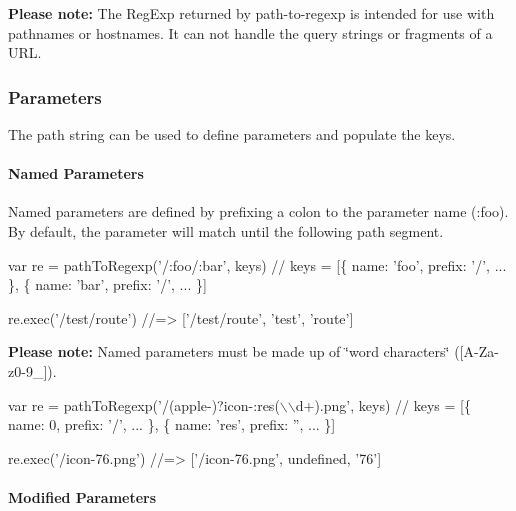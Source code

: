 

{\bfseries Please note\+:} The {\ttfamily Reg\+Exp} returned by {\ttfamily path-\/to-\/regexp} is intended for use with pathnames or hostnames. It can not handle the query strings or fragments of a U\+RL.

\subsubsection*{Parameters}

The path string can be used to define parameters and populate the keys.

\paragraph*{Named Parameters}

Named parameters are defined by prefixing a colon to the parameter name ({\ttfamily \+:foo}). By default, the parameter will match until the following path segment.


\begin{DoxyCode}
var re = pathToRegexp('/:foo/:bar', keys)
// keys = [\{ name: 'foo', prefix: '/', ... \}, \{ name: 'bar', prefix: '/', ... \}]

re.exec('/test/route')
//=> ['/test/route', 'test', 'route']
\end{DoxyCode}


{\bfseries Please note\+:} Named parameters must be made up of \char`\"{}word characters\char`\"{} ({\ttfamily \mbox{[}A-\/\+Za-\/z0-\/9\+\_\+\mbox{]}}).


\begin{DoxyCode}
var re = pathToRegexp('/(apple-)?icon-:res(\(\backslash\)\(\backslash\)d+).png', keys)
// keys = [\{ name: 0, prefix: '/', ... \}, \{ name: 'res', prefix: '', ... \}]

re.exec('/icon-76.png')
//=> ['/icon-76.png', undefined, '76']
\end{DoxyCode}


\paragraph*{Modified Parameters}

